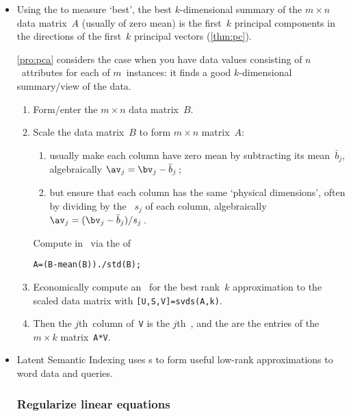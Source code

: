 \begin{itemize}
\item Using the  to measure `best', the best \(k\)-dimensional summary of the \(m\times n\) data matrix~\(A\) (usually of zero mean) is the first~\(k\) principal components in the directions of the first~\(k\) principal vectors (\cref{thm:pc}).

\itemme  
\cref{pro:pca} considers the case when you have data values consisting of \(n\)~attributes for each of \(m\)~instances: it finds a good \(k\)-dimensional summary\slash view of the data. 
\begin{enumerate} \sloppy
\item Form\slash enter the \(m\times n\) data matrix~\(B\).
\item {}Scale the data matrix~\(B\) to form \(m\times n\) matrix~\(A\):
\begin{enumerate}
\item usually make each column have zero mean by subtracting its mean~\(\bar b_j\), algebraically \(\av_j=\bv_j-\bar b_j\)\,;
\item but ensure that each column has the same `physical dimensions', often by dividing by the ~\(s_j\) of each column, algebraically \(\av_j=(\bv_j-\bar b_j)/s_j\)\,.
\end{enumerate}
Compute in \script\ via the  of
\begin{verbatim}
A=(B-mean(B))./std(B);
\end{verbatim}
\item  Economically compute an \svd\ for the best rank~\(k\) approximation to the scaled data matrix with \verb|[U,S,V]=svds(A,k)|.
\item Then the \(j\)th~column of~\verb|V| is the \(j\)th~, and the  are the entries of the \(m\times k\) matrix~\verb|A*V|.
\end{enumerate}

\item Latent Semantic Indexing uses \svd{}s to form useful low-rank approximations to word data and queries.



\subsubsection*{Regularize linear equations}


\end{itemize}
